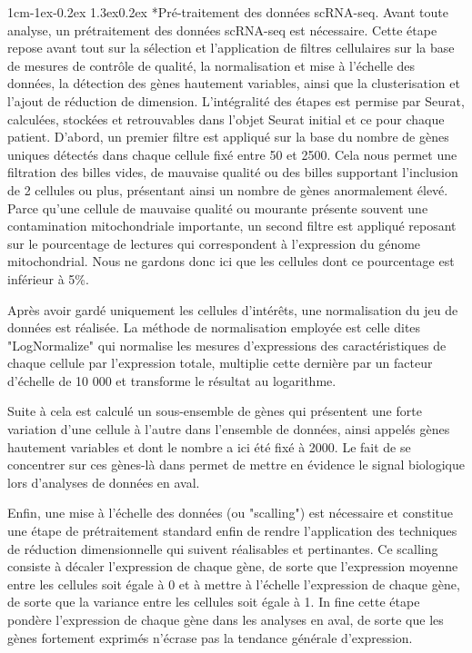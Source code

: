 \documentclass[12pt]{report}
\makeatletter
\renewcommand\subsubsection{\@startsection{subsubsection}{3}{\z@}%
	{1cm\@plus -1ex\@minus -0.2ex}%
	{1.3ex\@plus 0.2ex}%
	{\reset@font\normalsize\bf}}
\makeatother
\begin{document}
\subsubsection*{Pré-traitement des données scRNA-seq.}
Avant toute analyse, un prétraitement des données scRNA-seq est nécessaire\cite{Ilicic}. Cette étape repose avant tout sur la sélection et l'application de filtres cellulaires sur la base de mesures de contrôle de qualité, 
la normalisation et mise à l'échelle des données, la détection des gènes hautement variables, ainsi que la clusterisation et l'ajout de réduction de dimension.
L'intégralité des étapes est permise par Seurat, calculées, stockées et retrouvables dans l'objet Seurat initial et ce pour chaque patient. D'abord, un premier filtre est appliqué sur la base du nombre de gènes uniques détectés dans chaque cellule fixé entre 50 et 2500.
Cela nous permet une filtration des billes vides, de mauvaise qualité ou des billes supportant l'inclusion de 2 cellules ou plus, présentant ainsi un nombre de gènes anormalement élevé.
Parce qu'une cellule de mauvaise qualité ou mourante présente souvent une contamination mitochondriale importante, un second filtre est appliqué reposant sur le pourcentage de lectures qui correspondent à l'expression du génome mitochondrial.
Nous ne gardons donc ici que les cellules dont ce pourcentage est inférieur à 5\%.

Après avoir gardé uniquement les cellules d'intérêts, une normalisation du jeu de données est réalisée.
La méthode de normalisation employée est celle dites "LogNormalize" qui normalise les mesures d'expressions des caractéristiques de chaque cellule par l'expression totale, 
multiplie cette dernière par un facteur d'échelle de 10 000 et transforme le résultat au logarithme. 

Suite à cela est calculé un sous-ensemble de gènes qui présentent une forte variation d'une cellule à l'autre dans l'ensemble de données, ainsi appelés gènes hautement variables\cite{Brennecke} et dont le nombre a ici été fixé à 2000\cite{Stuart}.
Le fait de se concentrer sur ces gènes-là dans permet de mettre en évidence le signal biologique lors d'analyses de données en aval.

Enfin, une mise à l'échelle des données (ou "scalling") est nécessaire et constitue une étape de prétraitement standard enfin de rendre l'application des techniques de réduction dimensionnelle qui suivent réalisables et pertinantes.
Ce scalling consiste à décaler l'expression de chaque gène, de sorte que l'expression moyenne entre les cellules soit égale à 0 et à mettre à l'échelle l'expression de chaque gène, de sorte que la variance entre les cellules soit égale à 1.
In fine cette étape pondère l'expression de chaque gène dans les analyses en aval, de sorte que les gènes fortement exprimés n'écrase pas la tendance générale d'expression.
\end{document}
